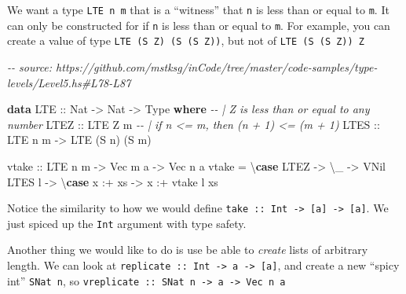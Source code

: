 \documentclass[]{article}
\newenvironment{Shaded}{}{}
\newcommand{\CommentTok}[1]{\textcolor[rgb]{0.38,0.63,0.69}{\textit{#1}}}
\newcommand{\DataTypeTok}[1]{\textcolor[rgb]{0.56,0.13,0.00}{#1}}
\newcommand{\KeywordTok}[1]{\textcolor[rgb]{0.00,0.44,0.13}{\textbf{#1}}}
\newcommand{\NormalTok}[1]{#1}
\newcommand{\OperatorTok}[1]{\textcolor[rgb]{0.40,0.40,0.40}{#1}}
\newcommand{\OtherTok}[1]{\textcolor[rgb]{0.00,0.44,0.13}{#1}}
\begin{document}
We want a type \texttt{LTE\ n\ m} that is a ``witness'' that \texttt{n} is less
than or equal to \texttt{m}. It can only be constructed for if \texttt{n} is
less than or equal to \texttt{m}. For example, you can create a value of type
\texttt{LTE\ (S\ Z)\ (S\ (S\ Z))}, but not of \texttt{LTE\ (S\ (S\ Z))\ Z}

\begin{Shaded}
\begin{Highlighting}[]
\CommentTok{{-}{-} source: https://github.com/mstksg/inCode/tree/master/code{-}samples/type{-}levels/Level5.hs\#L78{-}L87}

\KeywordTok{data} \DataTypeTok{LTE}\OtherTok{ ::} \DataTypeTok{Nat} \OtherTok{{-}\textgreater{}} \DataTypeTok{Nat} \OtherTok{{-}\textgreater{}} \DataTypeTok{Type} \KeywordTok{where}
  \CommentTok{{-}{-} | Z is less than or equal to any number}
  \DataTypeTok{LTEZ}\OtherTok{ ::} \DataTypeTok{LTE} \DataTypeTok{Z}\NormalTok{ m}
  \CommentTok{{-}{-} | if n \textless{}= m, then (n + 1) \textless{}= (m + 1)}
  \DataTypeTok{LTES}\OtherTok{ ::} \DataTypeTok{LTE}\NormalTok{ n m }\OtherTok{{-}\textgreater{}} \DataTypeTok{LTE}\NormalTok{ (}\DataTypeTok{\textquotesingle{}S}\NormalTok{ n) (}\DataTypeTok{\textquotesingle{}S}\NormalTok{ m)}

\OtherTok{vtake ::} \DataTypeTok{LTE}\NormalTok{ n m }\OtherTok{{-}\textgreater{}} \DataTypeTok{Vec}\NormalTok{ m a }\OtherTok{{-}\textgreater{}} \DataTypeTok{Vec}\NormalTok{ n a}
\NormalTok{vtake }\OtherTok{=}\NormalTok{ \textbackslash{}}\KeywordTok{case}
  \DataTypeTok{LTEZ} \OtherTok{{-}\textgreater{}}\NormalTok{ \textbackslash{}\_ }\OtherTok{{-}\textgreater{}} \DataTypeTok{VNil}
  \DataTypeTok{LTES}\NormalTok{ l }\OtherTok{{-}\textgreater{}}\NormalTok{ \textbackslash{}}\KeywordTok{case}\NormalTok{ x }\OperatorTok{:+}\NormalTok{ xs }\OtherTok{{-}\textgreater{}}\NormalTok{ x }\OperatorTok{:+}\NormalTok{ vtake l xs}
\end{Highlighting}
\end{Shaded}

Notice the similarity to how we would define
\texttt{take\ ::\ Int\ -\textgreater{}\ {[}a{]}\ -\textgreater{}\ {[}a{]}}. We
just spiced up the \texttt{Int} argument with type safety.

Another thing we would like to do is use be able to \emph{create} lists of
arbitrary length. We can look at
\texttt{replicate\ ::\ Int\ -\textgreater{}\ a\ -\textgreater{}\ {[}a{]}}, and
create a new ``spicy int'' \texttt{SNat\ n}, so
\texttt{vreplicate\ ::\ SNat\ n\ -\textgreater{}\ a\ -\textgreater{}\ Vec\ n\ a}
\end{document}
